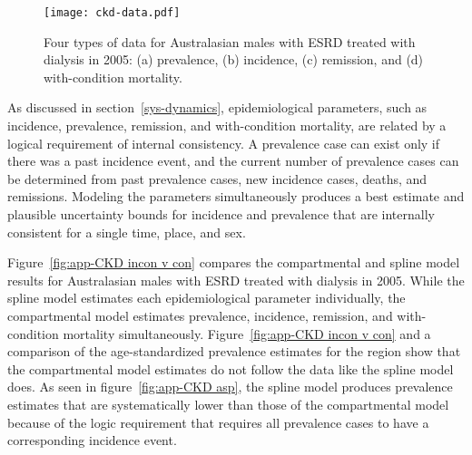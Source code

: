
    \begin{figure}[h]
        \begin{center}
            \texttt{[image: ckd-data.pdf]}
            \caption{Four types of data for Australasian males with ESRD treated with dialysis
              in 2005: (a) prevalence, (b) incidence, (c)
              remission, and (d) with-condition mortality.}
            \label{fig:app-CKD data}
        \end{center}
    \end{figure}

As discussed in section~\ref{sys-dynamics}, epidemiological parameters,
such as incidence, prevalence, remission, and with-condition
mortality, are related by a logical requirement of internal
consistency.  A prevalence case can exist only if there was a past
incidence event, and the current number of prevalence cases can be
determined from past prevalence cases, new incidence cases, deaths, and
remissions.  Modeling the parameters simultaneously produces a best
estimate and plausible uncertainty bounds for incidence and prevalence
that are internally consistent for a single time, place, and sex.

Figure~\ref{fig:app-CKD incon v con} compares the compartmental and
spline model results for Australasian males with
ESRD treated with dialysis in 2005.  While the spline model estimates each
epidemiological parameter individually, the compartmental model estimates
prevalence, incidence, remission, and with-condition mortality
simultaneously.  Figure~\ref{fig:app-CKD incon v con} and a
comparison of the age-standardized prevalence estimates for the region
show that the compartmental model estimates do not follow the data
like the spline model does.  As seen in figure~\ref{fig:app-CKD asp}, the
spline model produces prevalence estimates that are systematically lower
than those of the compartmental model because of the logic requirement that
requires all prevalence cases to have a corresponding incidence event.


